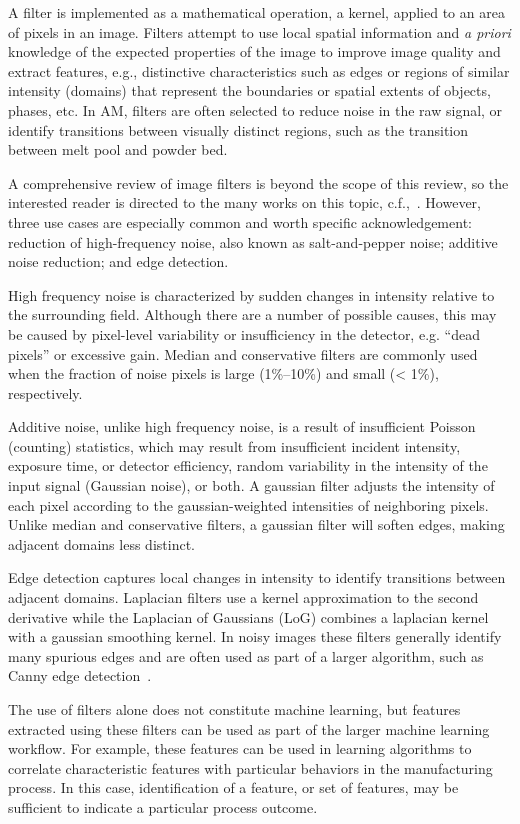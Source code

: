 A filter is implemented as a mathematical operation, a kernel, applied to an area of pixels in an image. Filters attempt to use local spatial information and \emph{a priori} knowledge of the expected properties of the image to improve image quality and extract features, e.g., distinctive characteristics such as edges or regions of similar intensity (domains) that represent the boundaries or spatial extents of objects, phases, etc. In AM, filters are often selected to reduce noise in the raw signal, or identify transitions between visually distinct regions, such as the transition between melt pool and powder bed.

A comprehensive review of image filters is beyond the scope of this review, so the interested reader is directed to the many works on this topic, c.f.,~\citet{Vernon1991}. However, three use cases are especially common and worth specific acknowledgement: reduction of high-frequency noise, also known as salt-and-pepper noise; additive noise reduction; and edge detection.

High frequency noise is characterized by sudden changes in intensity relative to the surrounding field. Although there are a number of possible causes, this may be caused by pixel-level variability or insufficiency in the detector, e.g. ``dead pixels'' or excessive gain. Median and conservative filters are commonly used when the fraction of noise pixels is large (1\%--10\%) and small (< 1\%), respectively.

Additive noise, unlike high frequency noise, is a result of insufficient Poisson (counting) statistics, which may result from insufficient incident intensity, exposure time, or detector efficiency, random variability in the intensity of the input signal (Gaussian noise), or both. A gaussian filter adjusts the intensity of each pixel according to the gaussian-weighted intensities of neighboring pixels. Unlike median and conservative filters, a gaussian filter will soften edges, making adjacent domains less distinct.

Edge detection captures local changes in intensity to identify transitions between adjacent domains. Laplacian filters use a kernel approximation to the second derivative while the Laplacian of Gaussians (LoG) combines a laplacian kernel with a gaussian smoothing kernel. In noisy images these filters generally identify many spurious edges and are often used as part of a larger algorithm, such as Canny edge detection~\cite{Canny1986}.

The use of filters alone does not constitute machine learning, but features extracted using these filters can be used as part of the larger machine learning workflow. For example, these features can be used in learning algorithms to correlate characteristic features with particular behaviors in the manufacturing process. In this case, identification of a feature, or set of features, may be sufficient to indicate a particular process outcome.

